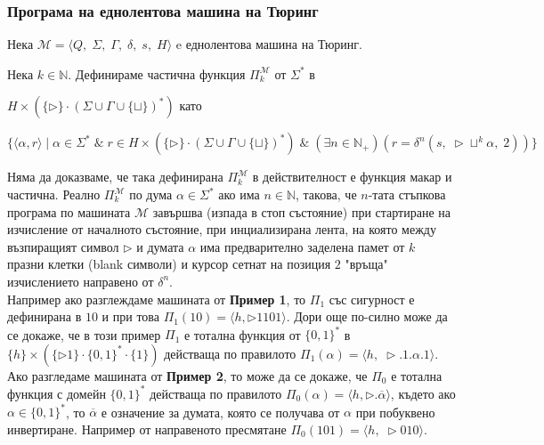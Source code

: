 \documentclass[14pt]{extarticle}
\begin{document}
\subsubsection*{Програма на еднолентова машина на Тюринг}
Нека \(\mathcal M = \langle Q,\; \Sigma,\; \Gamma,\; \delta,\; s,\; H \rangle\) e еднолентова машина на Тюринг.

Нека \(k \in \mathbb N\). Дефинираме частична функция \(\Pi_k^{\mathcal M}\) от \(\Sigma^*\) в

\(H \times (\{\triangleright\} \cdot (\Sigma \cup \Gamma \cup \{\sqcup\})^* ) \) като

\[\{ \langle \alpha, r \rangle \mid \alpha \in \Sigma^* \;\&\; r \in H \times (\{\triangleright\} \cdot (\Sigma \cup \Gamma \cup \{\sqcup\})^* ) \;\&\; (\exists n \in \mathbb{N}_+)(r = \delta^n(s,\; \triangleright \sqcup^k \alpha,\; 2))  \} \]

Няма да доказваме, че така дефинирана \(\Pi_k^{\mathcal M}\) в действителност е функция макар и частична.
Реално \(\Pi_k^{\mathcal M}\) по дума \(\alpha \in \Sigma^*\) ако има \(n \in \mathbb N\), такова, че \(n\)-тата стъпкова програма по машината \(\mathcal M\) завършва (изпада в стоп състояние) при стартиране на изчисление от началното състояние, при инциализирана лента, на която между възпиращият символ \(\triangleright\) и думата \(\alpha\) има предварително заделена памет от \(k\) празни клетки (blank символи) и курсор сетнат на позиция \(2\) \;"връща"\; изчислението направено от \(\delta^n\). \\

Например ако разглеждаме машината от \textbf{Пример 1}, то \(\Pi_1\) със сигурност е дефинирана в \(10\) и при това
\(\Pi_1(10) = \langle h, \triangleright 1101\rangle\). Дори още по-силно може да се докаже, че в този пример \(\Pi_1\) е тотална функция от \(\{0, 1\}^*\) в \(\{h\} \times (\{\triangleright 1\} \cdot \{0, 1\}^* \cdot \{1\})\) действаща по правилото \(\Pi_1(\alpha) = \langle h,\; \triangleright.1.\alpha.1 \rangle\). \\

Ако разгледаме машината от \textbf{Пример 2}, то може да се докаже, че \(\Pi_0\) е тотална функция с домейн \(\{0, 1\}^*\) действаща по правилото
\(\Pi_0(\alpha) = \langle h, \triangleright . \overline{\alpha} \rangle\),
където ако \(\alpha \in \{0, 1\}^*\), то
\(\overline{\alpha}\) е означение за думата, която се получава от \(\alpha\) при побуквено инвертиране.
Например от направеното пресмятане \(\Pi_0(101) = \langle h,\; \triangleright010\rangle\). \\
\end{document}
